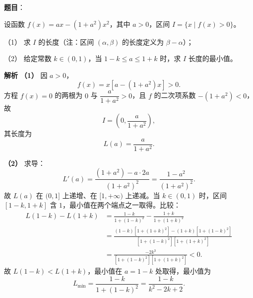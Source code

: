 \begin{answer}

\textbf{题目}：

设函数 $f(x)=ax-(1+a^2)x^2$，其中 $a>0$，区间 $I=\{x\mid f(x)>0\}$。

（1） 求 $I$ 的长度（注：区间 $(\alpha,\beta)$ 的长度定义为 $\beta-\alpha$）；

（2） 给定常数 $k\in(0,1)$，当 $1-k\leqslant a\leqslant1+k$ 时，求 $I$ 长度的最小值。

\textbf{解析}
\textbf{（1）} 因 $a>0$，
\nopagebreak[4]
\[f(x)=x\left[a-(1+a^2)x\right]>0.\]
方程 $f(x)=0$ 的两根为 $0$ 与 $\dfrac{a}{1+a^2}>0$，且 $f$ 的二次项系数 $-(1+a^2)<0$，故
\nopagebreak[4]
\[I=\left(0,\frac{a}{1+a^2}\right),\]
其长度为
\nopagebreak[4]
\[L(a)=\frac{a}{1+a^2}.\]

\textbf{（2）} 求导：
\nopagebreak[4]
\[L'(a)=\frac{(1+a^2)-a\cdot2a}{(1+a^2)^2}=\frac{1-a^2}{(1+a^2)^2}.\]
故 $L(a)$ 在 $(0,1]$ 上递增、在 $[1,+\infty)$ 上递减。当 $k\in(0,1)$ 时，区间 $[1-k,1+k]$ 含 $1$，最小值在两个端点之一取得。比较：
\nopagebreak[4]
\[\begin{aligned}
L(1-k)-L(1+k)
&=\frac{1-k}{1+(1-k)^2}-\frac{1+k}{1+(1+k)^2}\\
&=\frac{(1-k)\left[1+(1+k)^2\right]-(1+k)\left[1+(1-k)^2\right]}{\left[1+(1-k)^2\right]\left[1+(1+k)^2\right]}\\
&=\frac{-2k^3}{\left[1+(1-k)^2\right]\left[1+(1+k)^2\right]}<0.
\end{aligned}\]
故 $L(1-k)<L(1+k)$，最小值在 $a=1-k$ 处取得，最小值为
\nopagebreak[4]
\[L_{\min}=\frac{1-k}{1+(1-k)^2}=\frac{1-k}{k^2-2k+2}.\]


\gkanswer{答案（2）：$\dfrac{1-k}{k^2-2k+2}$。$L(a)=\dfrac{a}{1+a^2}$ 在 $(0,1]$ 增、$[1,+\infty)$ 减，且 $L(1-k)<L(1+k)$，故最小值在 $a=1-k$ 处取得。}

\end{answer}
